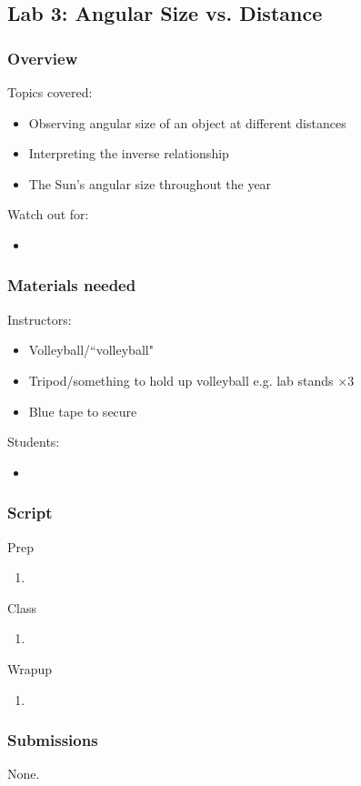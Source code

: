 \documentclass[12pt]{article}
\begin{document}
\newpage
\subsection{Lab 3: Angular Size vs. Distance}
\subsubsection{Overview}
Topics covered:
\begin{itemize}
\item Observing angular size of an object at different distances
\item Interpreting the inverse relationship
\item The Sun’s angular size throughout the year
\end{itemize}
Watch out for:
\begin{itemize}
\item 
\end{itemize}

\subsubsection{Materials needed}
Instructors:
\begin{itemize}
  \item Volleyball/``volleyball"
  \item Tripod/something to hold up volleyball e.g. lab stands $\times 3$
  \item Blue tape to secure
\end{itemize}
Students:
\begin{itemize}
  \item 
\end{itemize}

\subsubsection{Script}
Prep
\begin{enumerate}
\item
\end{enumerate}
Class
\begin{enumerate}
\item
\end{enumerate}
Wrapup
\begin{enumerate}
\item
\end{enumerate}

\subsubsection{Submissions}
None.
\end{document}
